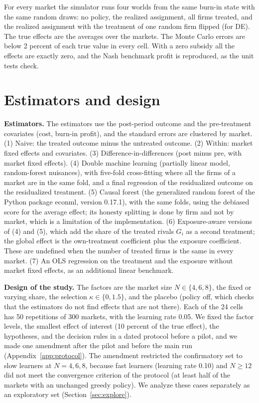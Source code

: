 \documentclass[11pt]{article}
\begin{document}
For every market the simulator runs four worlds from the same burn-in state with the same random draws: no policy, the realized assignment, all firms treated, and the realized assignment with the treatment of one random firm flipped (for DE). The true effects are the averages over the markets. The Monte Carlo errors are below 2 percent of each true value in every cell. With a zero subsidy all the effects are exactly zero, and the Nash benchmark profit is reproduced, as the unit tests check.

\section{Estimators and design}
\textbf{Estimators.} The estimators use the post-period outcome and the pre-treatment covariates (cost, burn-in profit), and the standard errors are clustered by market. (1) Naive: the treated outcome minus the untreated outcome. (2) Within: market fixed effects and covariates. (3) Difference-in-differences (post minus pre, with market fixed effects). (4) Double machine learning (partially linear model, random-forest nuisances), with five-fold cross-fitting where all the firms of a market are in the same fold, and a final regression of the residualized outcome on the residualized treatment. (5) Causal forest (the generalized random forest of the Python package econml, version 0.17.1), with the same folds, using the debiased score for the average effect; its honesty splitting is done by firm and not by market, which is a limitation of the implementation. (6) Exposure-aware versions of (4) and (5), which add the share of the treated rivals $G_i$ as a second treatment; the global effect is the own-treatment coefficient plus the exposure coefficient. These are undefined when the number of treated firms is the same in every market. (7) An OLS regression on the treatment and the exposure without market fixed effects, as an additional linear benchmark.

\textbf{Design of the study.} The factors are the market size $N\in\{4,6,8\}$, the fixed or varying share, the selection $\kappa\in\{0,1.5\}$, and the placebo (policy off, which checks that the estimators do not find effects that are not there). Each of the 24 cells has 50 repetitions of 300 markets, with the learning rate 0.05. We fixed the factor levels, the smallest effect of interest (10 percent of the true effect), the hypotheses, and the decision rules in a dated protocol before a pilot, and we made one amendment after the pilot and before the main run (Appendix~\ref{app:protocol}). The amendment restricted the confirmatory set to slow learners at $N=4,6,8$, because fast learners (learning rate 0.10) and $N\ge 12$ did not meet the convergence criterion of the protocol (at least half of the markets with an unchanged greedy policy). We analyze these cases separately as an exploratory set (Section~\ref{sec:explore}).
\end{document}
